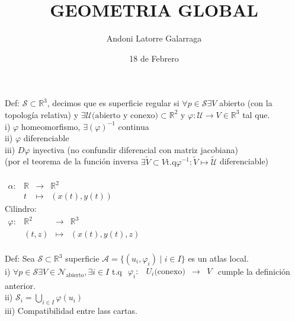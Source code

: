 \documentclass{article}
\title{GEOMETRIA GLOBAL}
\author{Andoni Latorre Galarraga}
\date{18 de Febrero}
\newcommand{\bb}[1]{\mathbb{#1}}
\begin{document}
\maketitle
Def: $\mathcal{S}\subset \bb{R}^3$, decimos que es superficie regular si $\forall p \in \mathcal{S} \exists V$ abierto (con la topología relativa) y $\exists \mathcal{U} \text{(abierto y conexo)} \subset \bb{R}^2$ y $\varphi : \mathcal{U} \longrightarrow V\in \bb{R}^3 $ tal que.\\
i) $\varphi$ homeomorfismo, $\exists (\varphi)^{-1}$ continua \\
ii) $\varphi$ diferenciable \\
iii) $D\varphi$ inyectiva (no confundir diferencial con matriz jacobiana)\\
(por el teorema de la función inversa $\exists \tilde{V}\subset V \text{t.q} \varphi^{-1} : \tilde{V}\longmapsto \tilde{\mathcal{U}}$ diferenciable)
\\
\\
$\begin{array}{crcl}
\alpha : & \bb{R} & \longrightarrow & \bb{R}^2 \\
& t & \longmapsto     & (x(t),y(t))
\end{array}$\\
Cilindro:\\
$\begin{array}{crcl}
\varphi : & \bb{R}^2 & \longrightarrow & \bb{R}^3 \\
& (t,z) & \longmapsto     & (x(t),y(t),z)
\end{array}$\\\\
Def: Sea $\mathcal{S}\subset \bb{R}^3$ superficie $\mathcal{A}= \{(u_i, \varphi_i) \mid i\in I\}$ es un atlas local.\\
i) $\forall p \in \mathcal{S} \exists V \in \mathcal{N}_\text{abierto}, \exists i \in I$ t.q $\begin{array}{crcl}
\varphi_i : & U_i\text{(conexo)} & \longrightarrow & V
\end{array}$ cumple la definición anterior.\\
ii) $\mathcal{S}_i = \bigcup_{i\in I} \varphi(u_i) $\\
iii) Compatibilidad entre lass cartas.\\\\
\end{document}
